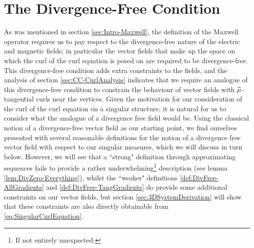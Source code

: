 \section{The Divergence-Free Condition} \label{sec:DivFreeCondition}
As was mentioned in section \ref{sec:Intro-Maxwell}, the definition of the Maxwell operator requires us to pay respect to the divergence-free nature of the electric and magnetic fields; in particular the vector fields that make up the space on which the curl of the curl equation is posed on are required to be divergence-free.
This divergence-free condition adds extra constraints to the fields, and the analysis of section \ref{sec:CC-CurlAnalysis} indicates that we require an analogue of this divergence-free condition to constrain the behaviour of vector fields with $\widetilde{\mu}$-tangential curls near the vertices.
Given the motivation for our consideration of the curl of the curl equation on a singular structure, it is natural for us to consider what the analogue of a divergence free field would be.
Using the classical notion of a divergence-free vector field as our starting point, we find ourselves presented with several reasonable definitions for the notion of a divergence free vector field with respect to our singular measures, which we will discuss in turn below.
However, we will see that a ``strong" definition through approximating sequences fails to provide a rather underwhelming\footnote{If not entirely unexpected.} description (see lemma \ref{lem:DivZero-Everything}), whilst the ``weaker" definitions \ref{def:DivFree-AllGradients} and \ref{def:DivFree-TangGradients} do provide some additional constraints on our vector fields, but section \ref{sec:3DSystemDerivation} will show that these constraints are also directly obtainable from \eqref{eq:SingularCurlEquation}.

